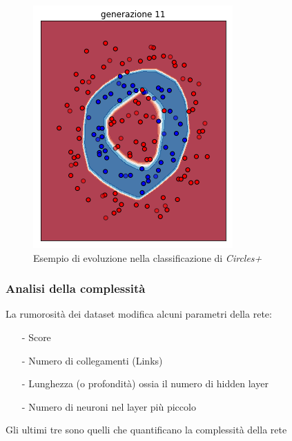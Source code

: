 \documentclass{beamer}
\begin{document}
\begin{frame}
\begin{figure}
  \includegraphics[scale = 0.25]{images/circle+-rnd-log./11.png}
  \caption{Esempio di evoluzione nella classificazione di \textit{Circles+}}
 \end{figure}
\end{frame}

\begin{frame}
 \frametitle{Analisi della complessità}
 La rumorosità dei dataset modifica alcuni parametri della rete:
 \begin{enumerate}
  \item [-] Score
  \item [-] Numero di collegamenti (Links)
  \item [-] Lunghezza (o profondità) ossia il numero di hidden layer 
  \item [-] Numero di neuroni nel layer più piccolo
 \end{enumerate}
 Gli ultimi tre sono quelli che quantificano la complessità della rete 
\end{frame}
\end{document}
